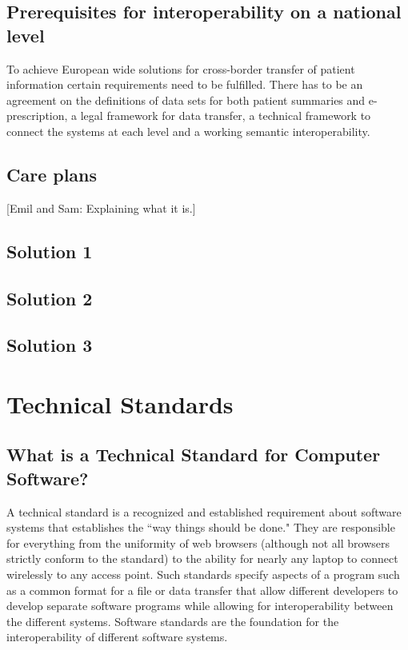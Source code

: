 \documentclass[14pt]{article}
\begin{document}
\subsection{Prerequisites for interoperability on a national level}

To achieve European wide solutions for cross-border transfer of patient information certain requirements need to be fulfilled. There has to be an agreement on the definitions of data sets for both patient summaries and e-prescription, a legal framework for data transfer, a technical framework to connect the systems at each level and a working semantic \gls{interoperability}. \cite{epSOS1}

\subsection{Care plans}
[Emil and Sam: Explaining what it is.]

\subsection{Solution 1}
\subsection{Solution 2}
\subsection{Solution 3}

\newpage

\section{Technical Standards}

\subsection{What is a Technical Standard for Computer Software?}
A technical standard is a recognized and established requirement about software systems that establishes the ``way things should be done." They are responsible for everything from the uniformity of web browsers (although not all browsers strictly conform to the standard) to the ability for nearly any laptop to connect wirelessly to any access point. Such standards specify aspects of a program such as a common format for a file or data transfer that allow different developers to develop separate software programs while allowing for \gls{interoperability} between the different systems. Software standards are the foundation for the \gls{interoperability} of different software systems.
\end{document}
